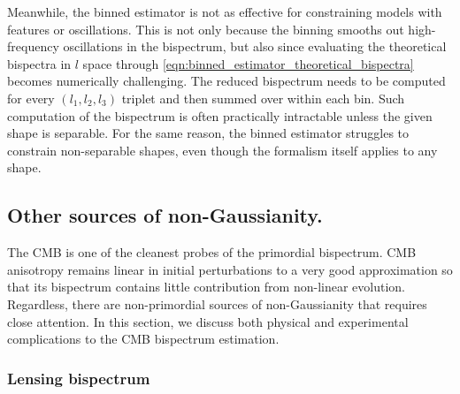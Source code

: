 Meanwhile, the binned estimator is not as effective for constraining models with features or oscillations. This is not only because the binning smooths out high-frequency oscillations in the bispectrum, but also since evaluating the theoretical bispectra in $l$ space through \eqref{eqn:binned_estimator_theoretical_bispectra} becomes numerically challenging. The reduced bispectrum needs to be computed for every $(l_1,l_2,l_3)$ triplet and then summed over within each bin. Such computation of the bispectrum is often practically intractable unless the given shape is separable. For the same reason, the binned estimator struggles to constrain non-separable shapes, even though the formalism itself applies to any shape.


\subsection{Other sources of non-Gaussianity.} \label{section:other_sources_of_non_gaussianity}

The CMB is one of the cleanest probes of the primordial bispectrum. CMB anisotropy remains linear in initial perturbations to a very good approximation so that its bispectrum contains little contribution from non-linear evolution. Regardless, there are non-primordial sources of non-Gaussianity that requires close attention. In this section, we discuss both physical and experimental complications to the CMB bispectrum estimation.

\subsubsection*{Lensing bispectrum}

